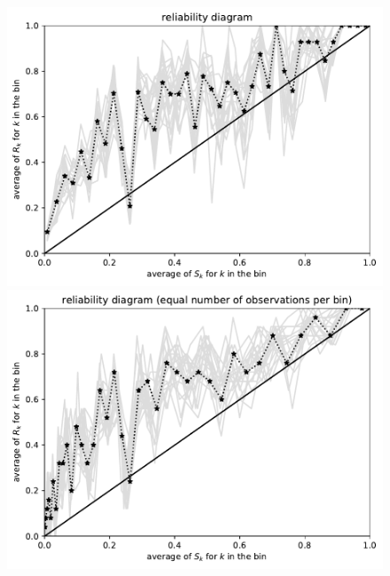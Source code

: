 \documentclass{article}
\begin{document}
\begin{figure}
\begin{centering}
\vspace{\vertsep}

\parbox{\imsize}{\includegraphics[width=\imsize]
                {./codes/unweighted/1000_40_1_2/equiprob.pdf}}
\quad\quad
\parbox{\imsize}{\includegraphics[width=\imsize]
                {./codes/unweighted/1000_40_1_2/equisamp.pdf}}

\vspace{\vertsep}


\end{centering}
\end{figure}
\end{document}
